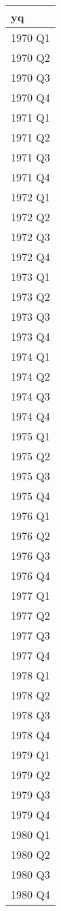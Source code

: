 \documentclass[
]{article}
\begin{document}
\begin{tabular}{l}
\hline
yq\\
\hline
1970 Q1\\
\hline
1970 Q2\\
\hline
1970 Q3\\
\hline
1970 Q4\\
\hline
1971 Q1\\
\hline
1971 Q2\\
\hline
1971 Q3\\
\hline
1971 Q4\\
\hline
1972 Q1\\
\hline
1972 Q2\\
\hline
1972 Q3\\
\hline
1972 Q4\\
\hline
1973 Q1\\
\hline
1973 Q2\\
\hline
1973 Q3\\
\hline
1973 Q4\\
\hline
1974 Q1\\
\hline
1974 Q2\\
\hline
1974 Q3\\
\hline
1974 Q4\\
\hline
1975 Q1\\
\hline
1975 Q2\\
\hline
1975 Q3\\
\hline
1975 Q4\\
\hline
1976 Q1\\
\hline
1976 Q2\\
\hline
1976 Q3\\
\hline
1976 Q4\\
\hline
1977 Q1\\
\hline
1977 Q2\\
\hline
1977 Q3\\
\hline
1977 Q4\\
\hline
1978 Q1\\
\hline
1978 Q2\\
\hline
1978 Q3\\
\hline
1978 Q4\\
\hline
1979 Q1\\
\hline
1979 Q2\\
\hline
1979 Q3\\
\hline
1979 Q4\\
\hline
1980 Q1\\
\hline
1980 Q2\\
\hline
1980 Q3\\
\hline
1980 Q4\\

\end{tabular}
\end{document}
